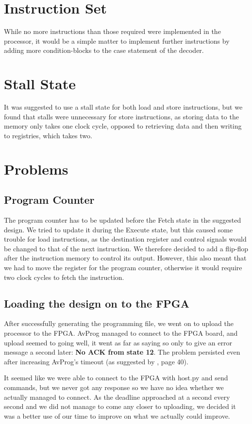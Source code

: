 \section{Instruction Set}

While no more instructions than those required were implemented in the processor, it would be a simple matter to implement further instructions by adding more condition-blocks to the case statement of the decoder.

\section{Stall State}

It was suggested to use a stall state for both load and store instructions, but we found that stalls were unnecessary for store instructions, as storing data to the memory only takes one clock cycle, opposed to retrieving data and then writing to registries, which takes two.

\section{Problems}

\subsection{Program Counter}

The program counter has to be updated before the Fetch state in the suggested design. We tried to update it during the Execute state, but this caused some trouble for load instructions, as the destination register and control signals would be changed to that of the next instruction. We therefore decided to add a flip-flop after the instruction memory to control its output. However, this also meant that we had to move the register for the program counter, otherwise it would require two clock cycles to fetch the instruction.

\subsection{Loading the design on to the FPGA}
\label{subsec:uploadproblems}

After successfully generating the programming file, we went on to upload the processor to the FPGA.
AvProg managed to connect to the FPGA board, and upload seemed to going well, it went as far as saying so only to give an error message a second later: \textbf{No ACK from state 12}.
The problem persisted even after increasing AvProg's timeout (as suggested by \cite{avnet-programming-user-manual}, page 40).

It seemed like we were able to connect to the FPGA with host.py and send commands, but we never got any response so we have no idea whether we actually managed to connect.
As the deadline approached at a second every second and we did not manage to come any closer to uploading, we decided it was a better use of our time to improve on what we actually could improve.
